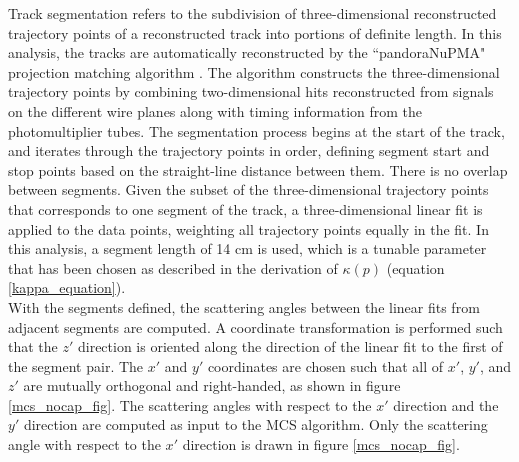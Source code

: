 \documentclass[a4paper,11pt]{article}
\begin{document}
Track segmentation refers to the subdivision of three-dimensional reconstructed trajectory points of a reconstructed track into portions of definite length. In this analysis, the tracks are automatically reconstructed by the ``pandoraNuPMA" projection matching algorithm \cite{Marshall:2015rfa}. The algorithm constructs the three-dimensional trajectory points by combining two-dimensional hits reconstructed from signals on the different wire planes along with timing information from the photomultiplier tubes. The segmentation process begins at the start of the track, and iterates through the trajectory points in order, defining segment start and stop points based on the straight-line distance between them. There is no overlap between segments. Given the subset of the three-dimensional trajectory points that corresponds to one segment of the track, a three-dimensional linear fit is applied to the data points, weighting all trajectory points equally in the fit. In this analysis, a segment length of 14 cm is used, which is a tunable parameter that has been chosen as described in the derivation of $\kappa(p)$ (equation \ref{kappa_equation}).\\

With the segments defined, the scattering angles between the linear fits from adjacent segments are computed. A coordinate transformation is performed such that the $z'$ direction is oriented along the direction of the linear fit to the first of the segment pair. The $x'$ and $y'$ coordinates are chosen such that all of $x'$, $y'$, and $z'$ are mutually orthogonal and right-handed, as shown in figure \ref{mcs_nocap_fig}. The scattering angles with respect to the $x'$ direction and the $y'$ direction are computed as input to the MCS algorithm. Only the scattering angle with respect to the $x'$ direction is drawn in figure \ref{mcs_nocap_fig}.
\end{document}
